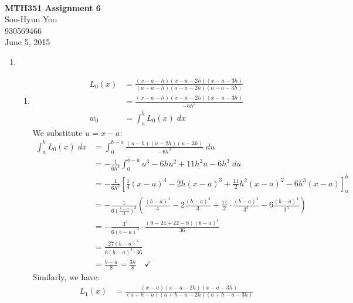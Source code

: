 \documentclass[11pt,letterpaper]{article}
\begin{document}
\fancyfoot{}
\begin{center}
  \hfill \\
  \vspace{4in}
  {\bf\Huge MTH351 Assignment 6} \\
  \vspace{2in}
  {\Large Soo-Hyun Yoo \\ 930569466 \\ June 5, 2015}
\end{center}

\newpage
{}


\begin{enumerate}
  \item
    \begin{enumerate}
      \item
        \begin{align*}
          L_0(x) &= \frac{(x-a-h)(x-a-2h)(x-a-3h)}{(a-a-h)(a-a-2h)(a-a-3h)} \\
                 &= \frac{(x-a-h)(x-a-2h)(x-a-3h)}{-6h^3} \\
          w_0 &= \int_a^bL_0(x)\;dx
        \end{align*}
        We substitute $u = x-a$:
        \begin{align*}
          \int_a^bL_0(x)\;dx &= \int_0^{b-a} \frac{(u-h)(u-2h)(u-3h)}{-6h^3}\;du \\
                             &= -\frac{1}{6h^3} \int_0^{b-a}u^3-6hu^2+11h^2u-6h^3\;du \\
                             &= -\frac{1}{6h^3} \left[\frac14(x-a)^4 - 2h(x-a)^3 + \frac{11}{2}h^2(x-a)^2 - 6h^3(x-a)\right]_a^b \\
                             &= -\frac{1}{6\left(\frac{b-a}{3}\right)^3} \left(\frac{(b-a)^4}{4} - 2\frac{(b-a)^4}{3} + \frac{11}{2}\cdot\frac{(b-a)^4}{3^2} - 6\frac{(b-a)^4}{3^3}\right) \\
                             &= -\frac{3^3}{6(b-a)^3} \cdot \frac{(9-24+22-8)(b-a)^4}{36} \\
                             &= \frac{27(b-a)^4}{6(b-a)^3\cdot36} \\
                             &= \frac{b-a}{8} = \frac{3h}{8} \quad \checkmark
        \end{align*}
        Similarly, we have:
        \begin{align*}
          L_1(x) &= \frac{(x-a)(x-a-2h)(x-a-3h)}{(a+h-a)(a+h-a-2h)(a+h-a-3h)} \\

\end{align*}
\end{enumerate}
\end{enumerate}
\end{document}
